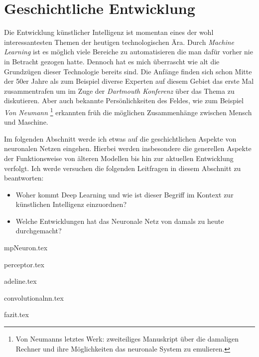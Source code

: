 \part{Geschichtliche Entwicklung}

Die Entwicklung künstlicher Intelligenz ist momentan eines der wohl interessantesten Themen der heutigen technologischen Ära. Durch \emph{Machine Learning} ist es möglich viele Bereiche zu automatisieren die man dafür vorher nie in Betracht gezogen hatte. Dennoch hat es mich überrascht wie \glqq alt \grqq die Grundzügen dieser Technologie bereits sind. Die Anfänge finden sich schon Mitte der 50er Jahre als zum Beispiel diverse Experten auf diesem Gebiet das erste Mal zusammentrafen um im Zuge der \emph{Dartmouth Konferenz} über das Thema zu diskutieren. Aber auch bekannte Persönlichkeiten des Feldes, wie zum Beispiel \emph{Von Neumann} \footnote{Von Neumanns letztes Werk: zweiteiliges Manuskript über die damaligen Rechner und ihre Möglichkeiten das neuronale System zu emulieren.} erkannten früh die möglichen Zusammenhänge zwischen Mensch und Maschine.

Im folgenden Abschnitt werde ich etwas auf die geschichtlichen Aspekte von neuronalen Netzen eingehen. Hierbei werden insbesondere die generellen Aspekte der Funktionsweise von älteren Modellen bis hin zur aktuellen Entwicklung verfolgt. Ich werde versuchen die folgenden Leitfragen in diesem Abschnitt zu beantworten: 

\begin{itemize}
\item Woher kommt Deep Learning und wie ist dieser Begriff im Kontext zur künstlichen Intelligenz einzuordnen?
\item Welche Entwicklungen hat das Neuronale Netz von damals zu heute durchgemacht?
\end{itemize}


{mpNeuron.tex}
\clearpage

{perceptor.tex}
\clearpage

{adeline.tex}
\clearpage

{convolutionalnn.tex}
\clearpage

{fazit.tex}